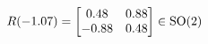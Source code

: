 \documentclass[preview]{standalone}
\begin{document}
\begin{align*}
\special{dvisvgm:raw <g id='unique000'>}R(-1.07) = \begin{bmatrix} 0.48 & 0.88 \\ -0.88 & 0.48 \end{bmatrix} \in \text{SO}(2)\special{dvisvgm:raw </g>}
\end{align*}
\end{document}
